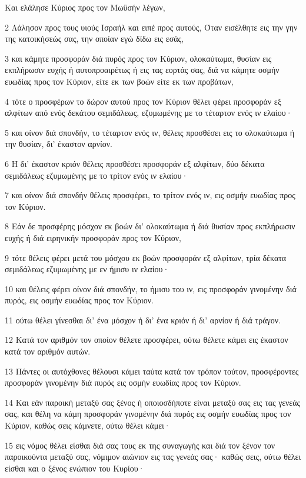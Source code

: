 \par Και ελάλησε Κύριος προς τον Μωϋσήν λέγων,
\par 2 Λάλησον προς τους υιούς Ισραήλ και ειπέ προς αυτούς, Όταν εισέλθητε εις την γην της κατοικήσεώς σας, την οποίαν εγώ δίδω εις εσάς,
\par 3 και κάμητε προσφοράν διά πυρός προς τον Κύριον, ολοκαύτωμα, θυσίαν εις εκπλήρωσιν ευχής ή αυτοπροαιρέτως ή εις τας εορτάς σας, διά να κάμητε οσμήν ευωδίας προς τον Κύριον, είτε εκ των βοών είτε εκ των προβάτων,
\par 4 τότε ο προσφέρων το δώρον αυτού προς τον Κύριον θέλει φέρει προσφοράν εξ αλφίτων από ενός δεκάτου σεμιδάλεως, εζυμωμένης με το τέταρτον ενός ιν ελαίου·
\par 5 και οίνον διά σπονδήν, το τέταρτον ενός ιν, θέλεις προσθέσει εις το ολοκαύτωμα ή την θυσίαν, δι' έκαστον αρνίον.
\par 6 Η δι' έκαστον κριόν θέλεις προσθέσει προσφοράν εξ αλφίτων, δύο δέκατα σεμιδάλεως εζυμωμένης με το τρίτον ενός ιν ελαίου·
\par 7 και οίνον διά σπονδήν θέλεις προσφέρει, το τρίτον ενός ιν, εις οσμήν ευωδίας προς τον Κύριον.
\par 8 Εάν δε προσφέρης μόσχον εκ βοών δι' ολοκαύτωμα ή διά θυσίαν προς εκπλήρωσιν ευχής ή διά ειρηνικήν προσφοράν προς τον Κύριον,
\par 9 τότε θέλεις φέρει μετά του μόσχου εκ βοών προσφοράν εξ αλφίτων, τρία δέκατα σεμιδάλεως εζυμωμένης με εν ήμισυ ιν ελαίου·
\par 10 και θέλεις φέρει οίνον διά σπονδήν, το ήμισυ του ιν, εις προσφοράν γινομένην διά πυρός, εις οσμήν ευωδίας προς τον Κύριον.
\par 11 ούτω θέλει γίνεσθαι δι' ένα μόσχον ή δι' ένα κριόν ή δι' αρνίον ή διά τράγον.
\par 12 Κατά τον αριθμόν τον οποίον θέλετε προσφέρει, ούτω θέλετε κάμει εις έκαστον κατά τον αριθμόν αυτών.
\par 13 Πάντες οι αυτόχθονες θέλουσι κάμει ταύτα κατά τον τρόπον τούτον, προσφέροντες προσφοράν γινομένην διά πυρός εις οσμήν ευωδίας προς τον Κύριον.
\par 14 Και εάν παροική μεταξύ σας ξένος ή οποιοσδήποτε είναι μεταξύ σας εις τας γενεάς σας, και θέλη να κάμη προσφοράν γινομένην διά πυρός εις οσμήν ευωδίας προς τον Κύριον, καθώς σεις κάμνετε, ούτω θέλει κάμει·
\par 15 εις νόμος θέλει είσθαι διά σας τους εκ της συναγωγής και διά τον ξένον τον παροικούντα μεταξύ σας, νόμιμον αιώνιον εις τας γενεάς σας· καθώς σεις, ούτω θέλει είσθαι και ο ξένος ενώπιον του Κυρίου·
